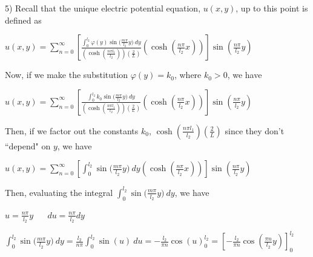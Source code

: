 \documentclass[executivepaper]{article}
\begin{document}
\begin{flushleft}

5) Recall that the unique electric potential equation, $u(x,y)$, up to this point is defined as

\begin{center}

$u(x,y)=\sum_{n=0}^{\infty} \left[\frac{\int_{0}^{l_{2}} \varphi(y) \sin\bigg(\frac{m \pi}{l_{2}} y\bigg) \ dy}{\left(\cosh\left(\frac{n \pi l_{1}}{l_{2}}\right)\right) \left(\frac{2}{L}\right)} \left(\cosh\left(\frac{n \pi}{l_{2}} x\right)\right)\right] \sin\left(\frac{n \pi}{l_{2}} y\right)$

\end{center}

Now, if we make the substitution $\varphi(y)=k_{0}$, where $k_{0} > 0$, we have

\begin{center}

$u(x,y)=\sum_{n=0}^{\infty} \left[\frac{\int_{0}^{l_{2}} k_{0} \sin\bigg(\frac{m \pi}{l_{2}} y\bigg) \ dy}{\left(\cosh\left(\frac{n \pi l_{1}}{l_{2}}\right)\right) \left(\frac{2}{L}\right)} \left(\cosh\left(\frac{n \pi}{l_{2}} x\right)\right)\right] \sin\left(\frac{n \pi}{l_{2}} y\right)$

\end{center}

Then, if we factor out the constants $k_{0}$, $\cosh\left(\frac{n \pi l_{1}}{l_{2}}\right) \left(\frac{2}{L}\right)$ since they don't ``depend" on $y$, we have

\begin{center}

$u(x,y)=\sum_{n=0}^{\infty} \left[\int_{0}^{l_{2}} \sin\bigg(\frac{m \pi}{l_{2}} y\bigg) \ dy \left(\cosh\left(\frac{n \pi}{l_{2}} x\right)\right)\right] \sin\left(\frac{n \pi}{l_{2}} y\right)$

\end{center}

Then, evaluating the integral $\int_{0}^{l_{2}} \sin\bigg(\frac{m \pi}{l_{2}} y\bigg) \ dy$, we have

\begin{center}

$u=\frac{n \pi}{l_{2}} y$ $\quad$ $du=\frac{n \pi}{l_{2}} dy$

\vspace{2mm}

$\int_{0}^{l_{2}} \sin\bigg(\frac{m \pi}{l_{2}} y\bigg) \ dy=\frac{l_{2}}{n \pi} \int_{0}^{l_{2}} \sin(u) \ du=-\frac{l_{2}}{\pi n} \cos(u)_{0}^{l_{2}}=\left[-\frac{l_{2}}{\pi n} \cos\left(\frac{\pi n}{l_{2}} y\right)\right]_{0}^{l_{2}}$


\end{center}
\end{flushleft}
\end{document}
